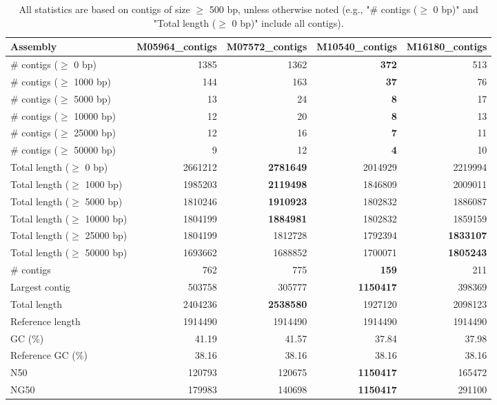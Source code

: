 \documentclass[12pt,a4paper]{article}
\begin{document}
\begin{table}[ht]
\begin{center}
\caption{All statistics are based on contigs of size $\geq$ 500 bp, unless otherwise noted (e.g., "\# contigs ($\geq$ 0 bp)" and "Total length ($\geq$ 0 bp)" include all contigs).}
\begin{tabular}{|l*{4}{|r}|}
\hline
Assembly & M05964\_contigs & M07572\_contigs & M10540\_contigs & M16180\_contigs \\ \hline
\# contigs ($\geq$ 0 bp) & 1385 & 1362 & {\bf 372} & 513 \\ \hline
\# contigs ($\geq$ 1000 bp) & 144 & 163 & {\bf 37} & 76 \\ \hline
\# contigs ($\geq$ 5000 bp) & 13 & 24 & {\bf 8} & 17 \\ \hline
\# contigs ($\geq$ 10000 bp) & 12 & 20 & {\bf 8} & 13 \\ \hline
\# contigs ($\geq$ 25000 bp) & 12 & 16 & {\bf 7} & 11 \\ \hline
\# contigs ($\geq$ 50000 bp) & 9 & 12 & {\bf 4} & 10 \\ \hline
Total length ($\geq$ 0 bp) & 2661212 & {\bf 2781649} & 2014929 & 2219994 \\ \hline
Total length ($\geq$ 1000 bp) & 1985203 & {\bf 2119498} & 1846809 & 2009011 \\ \hline
Total length ($\geq$ 5000 bp) & 1810246 & {\bf 1910923} & 1802832 & 1886087 \\ \hline
Total length ($\geq$ 10000 bp) & 1804199 & {\bf 1884981} & 1802832 & 1859159 \\ \hline
Total length ($\geq$ 25000 bp) & 1804199 & 1812728 & 1792394 & {\bf 1833107} \\ \hline
Total length ($\geq$ 50000 bp) & 1693662 & 1688852 & 1700071 & {\bf 1805243} \\ \hline
\# contigs & 762 & 775 & {\bf 159} & 211 \\ \hline
Largest contig & 503758 & 305777 & {\bf 1150417} & 398369 \\ \hline
Total length & 2404236 & {\bf 2538580} & 1927120 & 2098123 \\ \hline
Reference length & 1914490 & 1914490 & 1914490 & 1914490 \\ \hline
GC (\%) & 41.19 & 41.57 & 37.84 & 37.98 \\ \hline
Reference GC (\%) & 38.16 & 38.16 & 38.16 & 38.16 \\ \hline
N50 & 120793 & 120675 & {\bf 1150417} & 165472 \\ \hline
NG50 & 179983 & 140698 & {\bf 1150417} & 291100 \\ \hline

\end{tabular}
\end{center}
\end{table}
\end{document}
